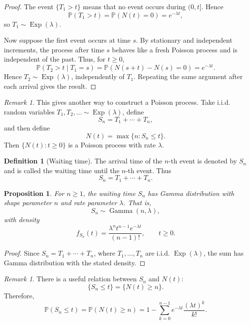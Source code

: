 \documentclass[11pt]{article}
\theoremstyle{plain}
\newtheorem{proposition}[theorem]{Proposition}
\theoremstyle{definition}
\newtheorem{definition}[theorem]{Definition}
\theoremstyle{remark}
\newtheorem{remark}[theorem]{Remark}
\begin{document}
	\begin{proof}
		The event \(\{T_1>t\}\) means that no event occurs during \((0,t]\). Hence
		\[
		\mathbb{P}(T_1>t)=\mathbb{P}(N(t)=0)=e^{-\lambda t},
		\]
		so \(T_1\sim\operatorname{Exp}(\lambda)\).
		
		Now suppose the first event occurs at time \(s\). By stationary and independent increments, the process after time \(s\) behaves like a fresh Poisson process and is independent of the past. Thus, for \(t\ge 0\),
		\[
		\mathbb{P}(T_2>t\mid T_1=s)
		=
		\mathbb{P}(N(s+t)-N(s)=0)
		=
		e^{-\lambda t}.
		\]
		Hence \(T_2\sim\operatorname{Exp}(\lambda)\), independently of \(T_1\). Repeating the same argument after each arrival gives the result.
	\end{proof}
	
	\begin{remark}
		This gives another way to construct a Poisson process. Take i.i.d. random variables \(T_1,T_2,\dots\sim\operatorname{Exp}(\lambda)\), define
		\[
		S_n=T_1+\cdots+T_n,
		\]
		and then define
		\[
		N(t)=\max\{n:S_n\le t\}.
		\]
		Then \(\{N(t):t\ge 0\}\) is a Poisson process with rate \(\lambda\).
	\end{remark}
	
	\begin{definition}[Waiting time]
		The arrival time of the \(n\)-th event is denoted by \(S_n\) and is called the waiting time until the \(n\)-th event. Thus
		\[
		S_n=T_1+\cdots+T_n.
		\]
	\end{definition}
	
	\begin{proposition}
		For \(n\ge 1\), the waiting time \(S_n\) has Gamma distribution with shape parameter \(n\) and rate parameter \(\lambda\). That is,
		\[
		S_n\sim \operatorname{Gamma}(n,\lambda),
		\]
		with density
		\[
		f_{S_n}(t)=\frac{\lambda^n t^{n-1}e^{-\lambda t}}{(n-1)!},
		\qquad t\ge 0.
		\]
	\end{proposition}
	
	\begin{proof}
		Since \(S_n=T_1+\cdots+T_n\), where \(T_1,\dots,T_n\) are i.i.d. \(\operatorname{Exp}(\lambda)\), the sum has Gamma distribution with the stated density.
	\end{proof}
	
	\begin{remark}
		There is a useful relation between \(S_n\) and \(N(t)\):
		\[
		\{S_n\le t\}=\{N(t)\ge n\}.
		\]
		Therefore,
		\[
		\mathbb{P}(S_n\le t)
		=
		\mathbb{P}(N(t)\ge n)
		=
		1-\sum_{k=0}^{n-1}e^{-\lambda t}\frac{(\lambda t)^k}{k!}.
		\]
	\end{remark}
	
\end{document}
